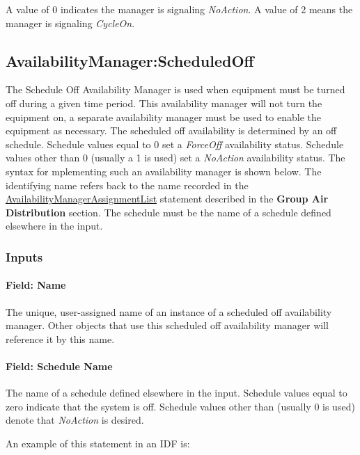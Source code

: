 A value of 0 indicates the manager is signaling \emph{NoAction}. A value of 2 means the manager is signaling \emph{CycleOn}.

\subsection{AvailabilityManager:ScheduledOff}\label{availabilitymanagerscheduledoff}

The Schedule Off Availability Manager is used when equipment must be turned off during a given time period. This availability manager will not turn the equipment on, a separate availability manager must be used to enable the equipment as necessary. The scheduled off availability is determined by an off schedule. Schedule values equal to 0 set a \emph{ForceOff} availability status. Schedule values other than 0 (usually a 1 is used) set a \emph{NoAction} availability status. The syntax for mplementing such an availability manager is shown below. The identifying name refers back to the name recorded in the \hyperref[availabilitymanagerassignmentlist]{AvailabilityManagerAssignmentList} statement described in the \textbf{Group Air Distribution} section. The schedule must be the name of a schedule defined elsewhere in the input.

\subsubsection{Inputs}\label{inputs-2-041}

\paragraph{Field: Name}\label{field-name-2-038}

The unique, user-assigned name of an instance of a scheduled off availability manager. Other objects that use this scheduled off availability manager will reference it by this name.

\paragraph{Field: Schedule Name}\label{field-schedule-name-2-003}

The name of a schedule defined elsewhere in the input. Schedule values equal to zero indicate that the system is off. Schedule values other than (usually 0 is used) denote that \emph{NoAction} is desired.

An example of this statement in an IDF is:

